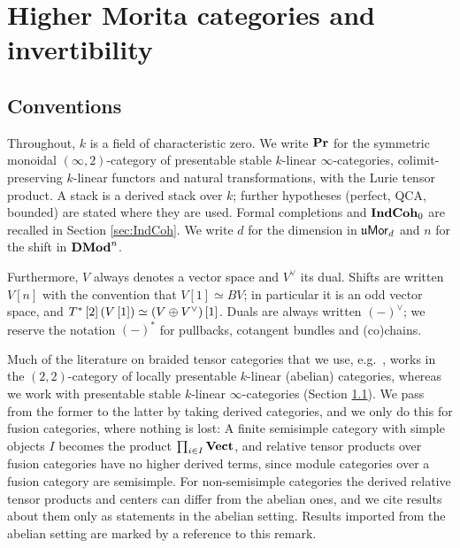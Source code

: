 \section{Higher Morita categories and invertibility}
\label{sec:Morita}

\subsection{Conventions}
\label{sec:conventions}

Throughout, $k$ is a field of characteristic zero. We write $\mathbf{Pr}$ for the symmetric monoidal
$\left(\infty,2\right)$-category of presentable stable $k$-linear $\infty$-categories,
colimit-preserving $k$-linear functors and natural transformations, with the Lurie tensor product.
A stack is a derived stack over $k$; further hypotheses (perfect, QCA, bounded) are stated where
they are used. Formal completions and $\mathbf{IndCoh}_0$ are recalled in Section \ref{sec:IndCoh}.
We write $d$ for the dimension in $\mathfrak{u}\mathsf{Mor}_d$ and $n$ for the shift in $\mathbf{DMod}^n$.

Furthermore, $V$ always denotes a vector space and $V^\vee$ its dual. Shifts are written
$V\left[n\right]$ with the convention that $V\left[1\right]\simeq BV$; in particular it is an odd vector space, and
$T^*\left[2\right]\left(V\left[1\right]\right)\simeq\left(V\oplus V^\vee\right)\left[1\right]$.
Duals are always written
$\left(-\right)^\vee$; we reserve the notation $\left(-\right)^*$ for pullbacks, cotangent bundles and
(co)chains.

\begin{rmk}
\label{rmk:abelian}
Much of the literature on braided tensor categories that we use, e.g.\
\cite{BJS, BJSS, Neg:frob}, works in the $\left(2,2\right)$-category of locally
presentable $k$-linear (abelian) categories, whereas we work with presentable stable
$k$-linear $\infty$-categories (Section \ref{sec:conventions}). We pass from the former to the
latter by taking derived categories, and we only do this for fusion categories, where nothing is
lost: A finite semisimple category with simple objects $I$ becomes the product 
$\prod_{i\in I} \mathbf{Vect}$, and relative tensor products over fusion categories have no higher
derived terms, since module categories over a fusion category are semisimple. For
non-semisimple categories the derived relative tensor products and centers can differ from
the abelian ones, and we cite results about them only as statements in the abelian
setting. Results imported from the abelian setting are marked by a reference to this
remark.
\end{rmk}

